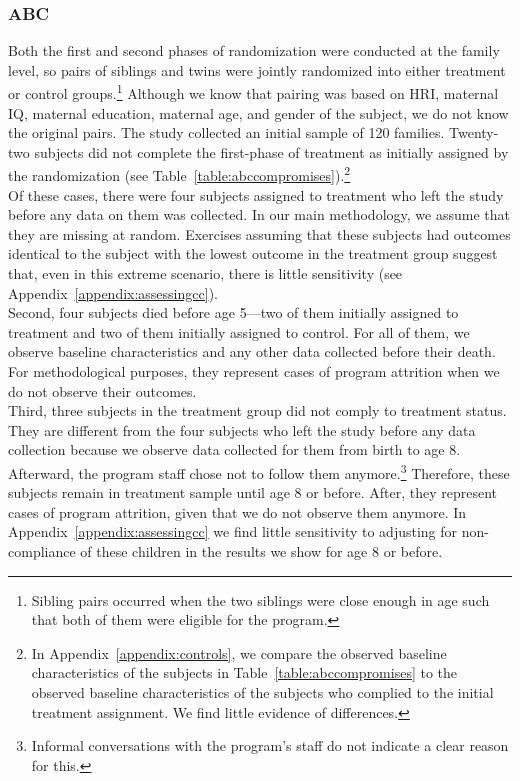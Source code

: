 \begin{appendices}
\subsubsection{ABC}

\noindent Both the first and second phases of randomization were conducted at the family level, so pairs of siblings and twins were jointly randomized into either treatment or control groups.\footnote{Sibling pairs occurred when the two siblings were close enough in age such that both of them were eligible for the program.} Although we know that pairing was based on HRI, maternal IQ, maternal education, maternal age, and gender of the subject, we do not know the original pairs. The study collected an initial sample of 120 families. Twenty-two subjects did not complete the first-phase of treatment as initially assigned by the randomization (see Table~\ref{table:abccompromises}).\footnote{In Appendix~\ref{appendix:controls}, we compare the observed baseline characteristics of the subjects in Table~\ref{table:abccompromises} to the observed baseline characteristics of the subjects who complied to the initial treatment assignment. We find little evidence of differences.}\\


\noindent Of these cases, there were four subjects assigned to treatment who left the study before any data on them was collected. In our main methodology, we assume that they are missing at random. Exercises assuming that these subjects had outcomes identical to the subject with the lowest outcome in the treatment group suggest that, even in this extreme scenario, there is little sensitivity (see Appendix~\ref{appendix:assessingcc}).\\

\noindent Second, four subjects died before age 5---two of them initially assigned to treatment and two of them initially assigned to control. For all of them, we observe baseline characteristics and any other data collected before their death. For methodological purposes, they represent cases of program attrition when we do not observe their outcomes.\\

\noindent Third, three subjects in the treatment group did not comply to treatment status. They are different from the four subjects who left the study before any data collection because we observe data collected for them from birth to age 8. Afterward, the program staff chose not to follow them anymore.\footnote{Informal conversations with the program's staff do not indicate a clear reason for this.} Therefore, these subjects remain in treatment sample until age 8 or before. After, they represent cases of program attrition, given that we do not observe them anymore. In Appendix~\ref{appendix:assessingcc} we find little sensitivity to adjusting for non-compliance of these children in the results we show for age 8 or before.\\


\end{appendices}
